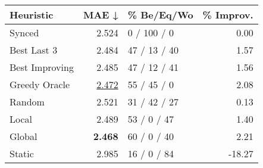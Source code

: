 \begin{tabular}{lrlr}
\toprule
\textbf{Heuristic} & \textbf{MAE ↓} & \textbf{\% Be/Eq/Wo} & \textbf{\% Improv.} \\
\midrule
            Synced &          2.524 &          0 / 100 / 0 &                0.00 \\
\midrule
       Best Last 3 &          2.484 &         47 / 13 / 40 &                1.57 \\
    Best Improving &          2.485 &         47 / 12 / 41 &                1.56 \\
\addlinespace
     Greedy Oracle &          \underline{2.472} &          55 / 45 / 0 &                2.08 \\
            Random &          2.521 &         31 / 42 / 27 &                0.13 \\
\midrule
             Local &          2.489 &          53 / 0 / 47 &                1.40 \\
            Global &          \textbf{2.468} &          60 / 0 / 40 &                2.21 \\
\midrule
            Static &          2.985 &          16 / 0 / 84 &              -18.27 \\
\bottomrule
\end{tabular}

\label{tab:hr_non_lr01_le1_bs4_Summary}
